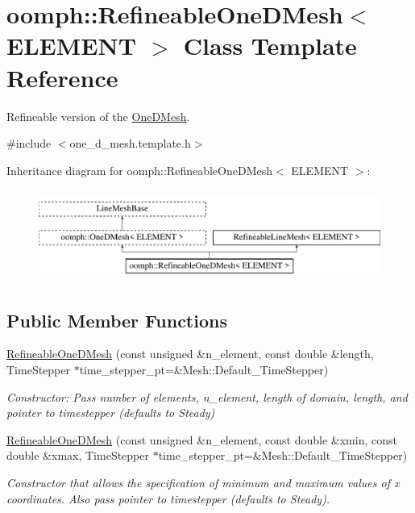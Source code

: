 \hypertarget{classoomph_1_1RefineableOneDMesh}{}\section{oomph\+:\+:Refineable\+One\+D\+Mesh$<$ E\+L\+E\+M\+E\+NT $>$ Class Template Reference}
\label{classoomph_1_1RefineableOneDMesh}


Refineable version of the \hyperlink{classoomph_1_1OneDMesh}{One\+D\+Mesh}.  




{\ttfamily \#include $<$one\+\_\+d\+\_\+mesh.\+template.\+h$>$}

Inheritance diagram for oomph\+:\+:Refineable\+One\+D\+Mesh$<$ E\+L\+E\+M\+E\+NT $>$\+:\begin{figure}[H]
\begin{center}
\leavevmode
\includegraphics[height=3.000000cm]{classoomph_1_1RefineableOneDMesh}
\end{center}
\end{figure}
\subsection*{Public Member Functions}
\begin{DoxyCompactItemize}
\item 
\hyperlink{classoomph_1_1RefineableOneDMesh_afd56915c8d1092fe6063184431c2d322}{Refineable\+One\+D\+Mesh} (const unsigned \&n\+\_\+element, const double \&length, Time\+Stepper $\ast$time\+\_\+stepper\+\_\+pt=\&Mesh\+::\+Default\+\_\+\+Time\+Stepper)
\begin{DoxyCompactList}\small\item\em Constructor\+: Pass number of elements, n\+\_\+element, length of domain, length, and pointer to timestepper (defaults to Steady) \end{DoxyCompactList}\item 
\hyperlink{classoomph_1_1RefineableOneDMesh_a6745ddd579ead642b9eac1b1520d4b5c}{Refineable\+One\+D\+Mesh} (const unsigned \&n\+\_\+element, const double \&xmin, const double \&xmax, Time\+Stepper $\ast$time\+\_\+stepper\+\_\+pt=\&Mesh\+::\+Default\+\_\+\+Time\+Stepper)
\begin{DoxyCompactList}\small\item\em Constructor that allows the specification of minimum and maximum values of x coordinates. Also pass pointer to timestepper (defaults to Steady). \end{DoxyCompactList}\end{DoxyCompactItemize}
